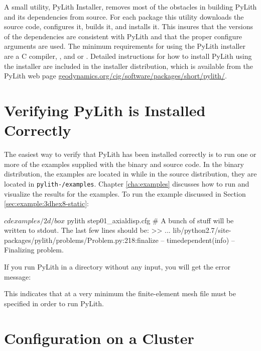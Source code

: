 A small utility, PyLith Installer, removes most of the obstacles in
building PyLith and its dependencies from source. For each package
this utility downloads the source code, configures it, builds it, and
installs it. This insures that the versions of the dependencies are
consistent with PyLith and that the proper configure arguments are
used. The minimum requirements for using the PyLith installer are a C
compiler, , and  or .
Detailed instructions for how to install PyLith using the installer
are included in the installer distribution, which is available from
the PyLith web page
\url{geodynamics.org/cig/software/packages/short/pylith/}.


\section{Verifying PyLith is Installed Correctly}

The easiest way to verify that PyLith has been installed correctly is
to run one or more of the examples supplied with the binary and source
code. In the binary distribution, the examples are located in
 while in the source distribution,
they are located in \texttt{pylith-\pylithVersionNumber/examples}. Chapter
\vref{cha:examples} discusses how to run and visualize the results
for the examples. To run the example discussed in Section
\vref{sec:example:3dhex8-static}:
\begin{shell}
$ cd examples/2d/box
$ pylith step01_axialdisp.cfg
# A bunch of stuff will be written to stdout. The last few lines should be:
 >> ... lib/python2.7/site-packages/pylith/problems/Problem.py:218:finalize
 -- timedependent(info)
 -- Finalizing problem.
\end{shell}
If you run PyLith in a directory without any input, you will get the
error message:
This indicates that at a very minimum the finite-element mesh file
must be specified in order to run PyLith.


\section{Configuration on a Cluster}

